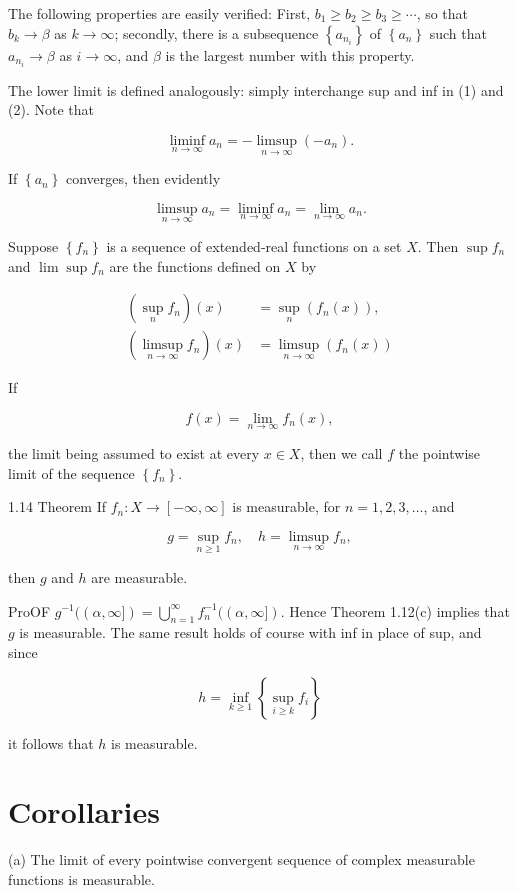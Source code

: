 \documentclass[10pt]{article}
\begin{document}
The following properties are easily verified: First, $b_{1} \geq b_{2} \geq b_{3} \geq \cdots$, so that $b_{k} \rightarrow \beta$ as $k \rightarrow \infty$; secondly, there is a subsequence $\left\{a_{n_{i}}\right\}$ of $\left\{a_{n}\right\}$ such that $a_{n_{i}} \rightarrow \beta$ as $i \rightarrow \infty$, and $\beta$ is the largest number with this property.

The lower limit is defined analogously: simply interchange sup and inf in (1) and (2). Note that

$$
\liminf _{n \rightarrow \infty} a_{n}=-\limsup _{n \rightarrow \infty}\left(-a_{n}\right) .
$$

If $\left\{a_{n}\right\}$ converges, then evidently

$$
\limsup _{n \rightarrow \infty} a_{n}=\liminf _{n \rightarrow \infty} a_{n}=\lim _{n \rightarrow \infty} a_{n} .
$$

Suppose $\left\{f_{n}\right\}$ is a sequence of extended-real functions on a set $X$. Then $\sup f_{n}$ and $\lim \sup f_{n}$ are the functions defined on $X$ by

$$
\begin{aligned}
\left(\sup _{n} f_{n}\right)(x) & =\sup _{n}\left(f_{n}(x)\right), \\
\left(\limsup _{n \rightarrow \infty} f_{n}\right)(x) & =\limsup _{n \rightarrow \infty}\left(f_{n}(x)\right)
\end{aligned}
$$

If

$$
f(x)=\lim _{n \rightarrow \infty} f_{n}(x),
$$

the limit being assumed to exist at every $x \in X$, then we call $f$ the pointwise limit of the sequence $\left\{f_{n}\right\}$.

1.14 Theorem If $f_{n}: X \rightarrow[-\infty, \infty]$ is measurable, for $n=1,2,3, \ldots$, and

$$
g=\sup _{n \geq 1} f_{n}, \quad h=\limsup _{n \rightarrow \infty} f_{n},
$$

then $g$ and $h$ are measurable.

ProOF $g^{-1}((\alpha, \infty])=\bigcup_{n=1}^{\infty} f_{n}^{-1}((\alpha, \infty])$. Hence Theorem 1.12(c) implies that $g$ is measurable. The same result holds of course with inf in place of sup, and since

$$
h=\inf _{k \geq 1}\left\{\sup _{i \geq k} f_{i}\right\}
$$

it follows that $h$ is measurable.

\section{Corollaries}
(a) The limit of every pointwise convergent sequence of complex measurable functions is measurable.
\end{document}
